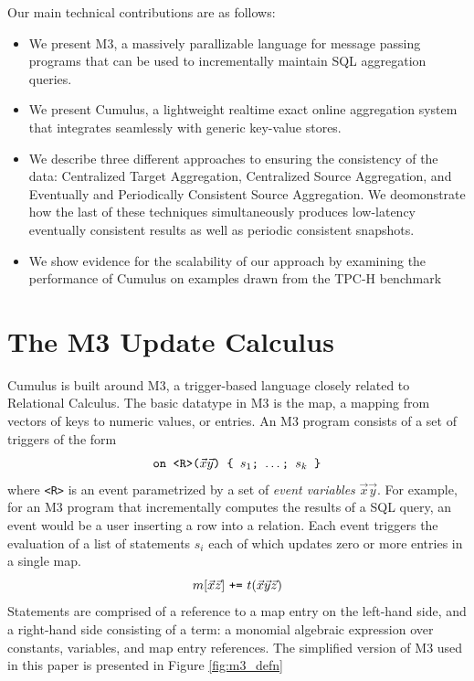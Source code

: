 \documentclass{vldb}
\begin{document}
Our main technical contributions are as follows:
\begin{itemize}
\item We present M3, a massively parallizable language for message passing programs that can be used to incrementally maintain SQL aggregation queries.
\item We present Cumulus, a lightweight realtime exact online aggregation system that integrates seamlessly with generic key-value stores. 
\item We describe three different approaches to ensuring the consistency of the data: Centralized Target Aggregation, Centralized Source Aggregation, and Eventually and Periodically Consistent Source Aggregation.  We deomonstrate how the last of these techniques simultaneously produces low-latency eventually consistent results as well as periodic consistent snapshots.
\item We show evidence for the scalability of our approach by examining the performance of Cumulus on examples drawn from the TPC-H benchmark\cite{tpch2008}
\end{itemize}


\section{The M3 Update Calculus}
Cumulus is built around M3, a trigger-based language closely related to Relational Calculus.  The basic datatype in M3 is the map, a mapping from vectors of keys to numeric values, or entries.  An M3 program consists of a set of triggers of the form
\[
\mbox{{\tt on <R>($\vec x \vec y$) \{ $s_1$; $\dots$; $s_k$ \}}}
\]
where {\tt <R>} is an event parametrized by a set of \textit{event variables} $\vec x \vec y$.  For example, for an M3 program that incrementally computes the results of a SQL query, an event would be a user inserting a row into a relation.  Each event triggers the evaluation of a list of statements $s_i$ each of which updates zero or more entries in a single map.
\[
\mbox{$m[\vec{x}\vec{z}]$ {\tt +=} $t(\vec x \vec y \vec z)$}
\]
Statements are comprised of a reference to a map entry on the left-hand side, and a right-hand side consisting of a term: a monomial algebraic expression over constants, variables, and map entry references.  The simplified version of M3 used in this paper is presented in Figure \ref{fig:m3_defn}
\end{document}
